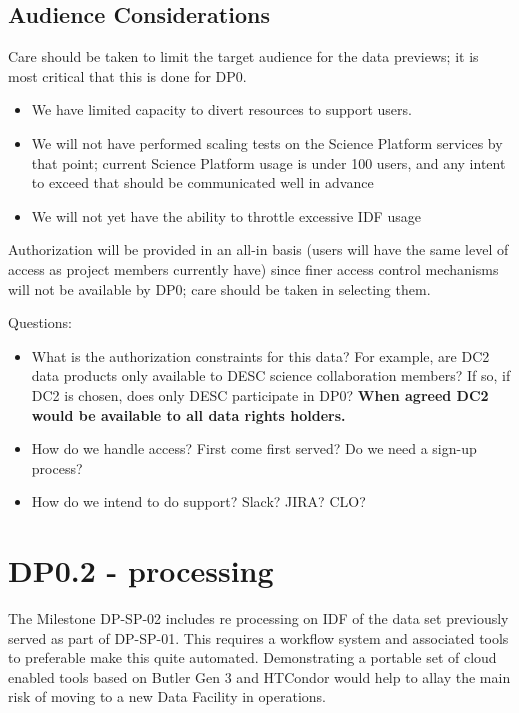 \subsection{Audience Considerations}

Care should be taken to limit the target audience for the data previews; it is most critical that this is done for DP0.

\begin{itemize}

\item We have limited capacity to divert resources to support users.

\item We will not have performed scaling tests on the Science Platform services by that point; current Science Platform usage is under 100 users, and any intent to exceed that should be communicated well in advance

\item We will not yet have the ability to throttle excessive IDF usage

\end{itemize}

Authorization will be provided in an all-in basis (users will have the same level of access as project members currently have) since finer access control mechanisms will not be available by DP0; care should be taken in selecting them.

Questions:

\begin{itemize}

\item What is the authorization constraints for this data? For example, are DC2 data products only available to DESC science collaboration members? If so, if DC2 is chosen, does only DESC participate in DP0?
	{\bf When agreed DC2 would be available to all data rights holders.}

\item How do we handle access? First come first served? Do we need a sign-up process?

\item How do we intend to do support? Slack? JIRA? CLO?

\end{itemize}

\section{DP0.2 - processing}
The Milestone DP-SP-02 includes re processing on IDF of the data set previously served as part of DP-SP-01.
This requires a workflow system and associated tools to preferable make this quite automated.
Demonstrating a portable set of cloud enabled tools based on Butler Gen 3 and HTCondor would help to allay the main risk of moving to a new Data Facility in operations.

